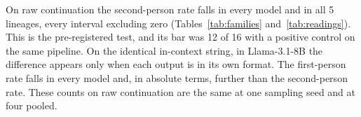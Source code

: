 On raw continuation the second-person rate falls in every model and in all 5 lineages, every interval excluding zero (Tables~\ref{tab:families} and~\ref{tab:readings}). This is the pre-registered test, and its bar was 12 of 16 with a positive control on the same pipeline. On the identical in-context string, in Llama-3.1-8B the difference appears only when each output is in its own format. The first-person rate falls in every model and, in absolute terms, further than the second-person rate. These counts on raw continuation are the same at one sampling seed and at four pooled.

